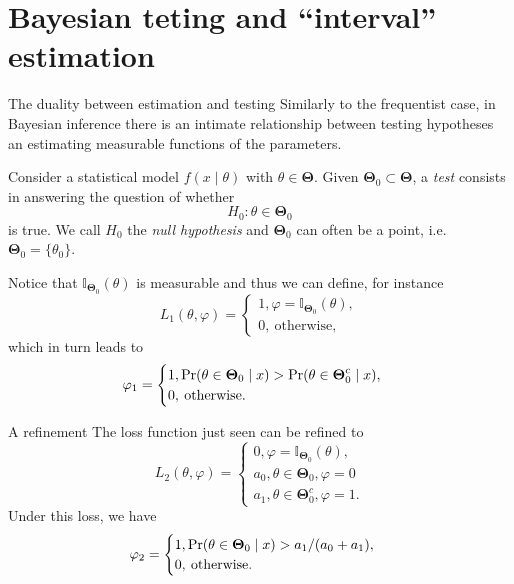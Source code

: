 \section*{Bayesian teting and ``interval'' estimation}
\begin{frame}{The duality between estimation and testing}
Similarly to the frequentist case, in Bayesian inference there is an intimate relationship between testing hypotheses an estimating measurable functions of the parameters.
\begin{defn}[Test]
 Consider a statistical model $f(x \mid \theta)$  with $\theta \in \boldsymbol{\Theta}$. 
 Given $\boldsymbol{\Theta}_0 \subset \boldsymbol{\Theta}$, a \textit{test} consists in answering the question of whether
 $$ H_0 : \theta \in \boldsymbol{\Theta}_0 $$
 is true.
 We call $H_0$ the \textit{null hypothesis} and $\boldsymbol{\Theta}_0$ can often be a point, i.e. $\boldsymbol{\Theta}_0 = \{\theta_0 \}$.
\end{defn}
Notice that $\mathbb{I}_{\boldsymbol{\Theta}_0}(\theta)$ is measurable and thus we can define, for instance
\begin{equation*}
L_1(\theta, \varphi) = \begin{cases}
1, \varphi = \mathbb{I}_{\boldsymbol{\Theta}_0}(\theta),\\
0, \: \text{otherwise},
\end{cases}
\end{equation*}
which in turn leads to 
\begin{equation*}
\varphi_1 = \begin{cases}
1, \operatorname{Pr}(\theta \in \boldsymbol{\Theta}_0 \mid x) > \operatorname{Pr}(\theta \in \boldsymbol{\Theta}_0^c \mid x),\\
0, \: \text{otherwise}.
\end{cases}
\end{equation*}
\end{frame}
\begin{frame}{A refinement}
 The loss function just seen can be refined to
 \begin{equation*}
L_2(\theta, \varphi) = \begin{cases}
0, \varphi = \mathbb{I}_{\boldsymbol{\Theta}_0}(\theta),\\
a_0, \theta \in \boldsymbol{\Theta}_0, \varphi = 0\\
a_1, \theta \in \boldsymbol{\Theta}_0^c, \varphi = 1.
\end{cases}
\end{equation*}
Under this loss, we have
\begin{equation*}
\varphi_2 = \begin{cases}
1, \operatorname{Pr}(\theta \in \boldsymbol{\Theta}_0 \mid x) >  a_1/(a_0 + a_1),\\
0, \: \text{otherwise}.
\end{cases}
\end{equation*}
\end{frame}
